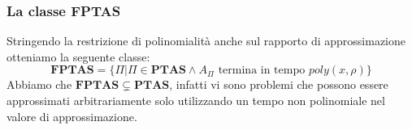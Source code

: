 \subsubsection{La classe {\bf FPTAS}}
Stringendo la restrizione di polinomialità anche sul rapporto di approssimazione 
otteniamo la seguente classe: 
$$
\mathbf{FPTAS} =  \{ \Pi | \Pi \in \mathbf{PTAS} \land A_{\Pi} \text{ termina in tempo } poly(x, \rho)\}
$$
Abbiamo che  $\mathbf{FPTAS} \subsetneq \mathbf{PTAS}$, infatti vi sono problemi 
che possono essere approssimati arbitrariamente solo utilizzando un tempo non 
polinomiale nel valore di approssimazione. 




\begin{figure}[h]
  \centering




\begin{tikzpicture}[x=0.75pt,y=0.75pt,yscale=-1,xscale=1]


\end{tikzpicture}
\end{figure}
